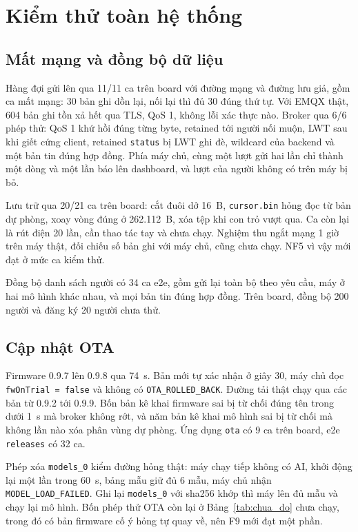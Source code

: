 \documentclass[../DoAn.tex]{subfiles}
\begin{document}
\section{Kiểm thử toàn hệ thống}
\label{section:5.7}

\subsection{Mất mạng và đồng bộ dữ liệu}
\label{section:5.7.1}

Hàng đợi gửi lên qua 11/11 ca trên board với đường mạng và đường lưu giả, gồm ca mất mạng: 30 bản ghi dồn lại, nối lại thì đủ 30 đúng thứ tự.
Với EMQX thật, 604 bản ghi tồn xả hết qua TLS, QoS 1, không lỗi xác thực nào. Broker qua 6/6 phép thử: QoS 1 khứ hồi đúng từng byte, retained
tới người nối muộn, LWT sau khi giết cứng client, retained \texttt{status} bị LWT ghi đè, wildcard của backend và một bản tin đúng hợp đồng.
Phía máy chủ, cùng một lượt gửi hai lần chỉ thành một dòng và một lần báo lên dashboard, và lượt của người không có trên máy bị bỏ.

Lưu trữ qua 20/21 ca trên board: cắt đuôi dở 16~B, \texttt{cursor.bin} hỏng đọc từ bản dự phòng, xoay vòng đúng ở 262.112~B, xóa tệp khi con
trỏ vượt qua. Ca còn lại là rút điện 20 lần, cần thao tác tay và chưa chạy. Nghiệm thu ngắt mạng 1 giờ trên máy thật, đối chiếu số bản ghi với
máy chủ, cũng chưa chạy. NF5 vì vậy mới đạt ở mức ca kiểm thử.

Đồng bộ danh sách người có 34 ca e2e, gồm gửi lại toàn bộ theo yêu cầu, máy ở hai mô hình khác nhau, và mọi bản tin đúng hợp đồng. Trên board,
đồng bộ 200 người và đăng ký 20 người chưa thử.

\subsection{Cập nhật OTA}
\label{section:5.7.2}

Firmware 0.9.7 lên 0.9.8 qua 74~s. Bản mới tự xác nhận ở giây 30, máy chủ đọc \texttt{fwOnTrial = false} và không có \texttt{OTA\_ROLLED\_BACK}.
Đường tải thật chạy qua các bản từ 0.9.2 tới 0.9.9. Bốn bản kê khai firmware sai bị từ chối đúng tên trong dưới 1~s mà broker không rớt, và năm bản
kê khai mô hình sai bị từ chối mà không lần nào xóa phân vùng dự phòng. Ứng dụng \texttt{ota} có 9 ca trên board, e2e \texttt{releases} có 32 ca.

Phép xóa \texttt{models\_0} kiểm đường hỏng thật: máy chạy tiếp không có AI, khởi động lại một lần trong 60~s, bảng mẫu giữ đủ 6 mẫu, máy chủ nhận
\texttt{MODEL\_LOAD\_FAILED}. Ghi lại \texttt{models\_0} với sha256 khớp thì máy lên đủ mẫu và chạy lại mô hình. Bốn phép thử OTA còn lại ở
Bảng~\ref{tab:chua_do} chưa chạy, trong đó có bản firmware cố ý hỏng tự quay về, nên F9 mới đạt một phần.
\end{document}
